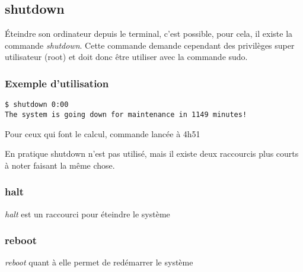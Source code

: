 \subsection*{shutdown}
Éteindre son ordinateur depuis le terminal, c'est possible,  pour cela, il existe la commande \emph{shutdown}.
Cette commande demande cependant des privilèges super utilisateur (root) et doit donc être utiliser avec la commande sudo.
\subsubsection*{Exemple d'utilisation}

\begin{lstlisting}
$ shutdown 0:00
The system is going down for maintenance in 1149 minutes!
\end{lstlisting}
\begin{tiny}
Pour ceux qui font le calcul, commande lancée à 4h51\\
\end{tiny}

En pratique shutdown n'est pas utilisé, mais il existe deux raccourcis plus courts à noter faisant la même chose.

\subsubsection*{halt}
\emph{halt} est un raccourci pour éteindre le système

\subsubsection*{reboot}
\emph{reboot} quant à elle permet de redémarrer le système
